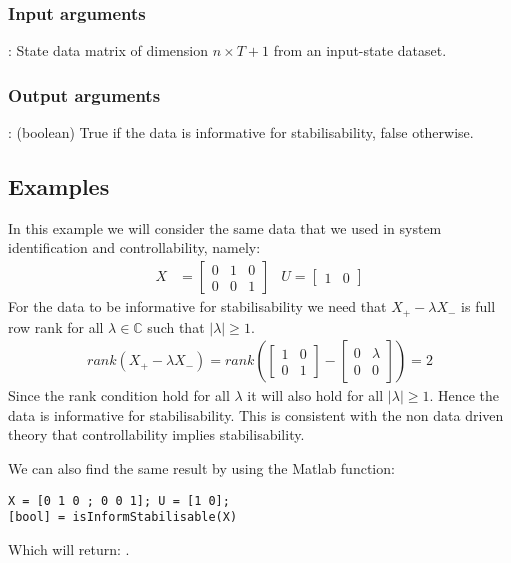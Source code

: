 \subsubsection*{Input arguments}
\textbf{}: State data matrix of dimension $n \times T+1$ from an input-state dataset. \

\subsubsection*{Output arguments}
\textbf{}: (boolean) True if the data is informative for stabilisability, false otherwise.

\subsection{Examples}
In this example we will consider the same data that we used in system identification and controllability, namely:
\begin{align*}
X &= \begin{bmatrix} 0&1&0 \\ 0&0&1 \end{bmatrix} & U = \begin{bmatrix}	1&0	\end{bmatrix}
\end{align*} 
For the data to be informative for stabilisability we need that $X_+ - \lambda X_-$ is full row rank for all $\lambda \in \mathbb{C}$ such that $|\lambda| \geq 1$.
\begin{align*}
rank(X_+ - \lambda X_-) = rank\left(\begin{bmatrix} 1&0\\0&1\end{bmatrix} - \begin{bmatrix} 0&\lambda\\0&0\end{bmatrix}\right) = 2
\end{align*}
Since the rank condition hold for all $\lambda$ it will also hold for all $|\lambda| \geq 1$. Hence the data is informative for stabilisability. This is consistent with the non data driven theory that controllability implies stabilisability. 

We can also find the same result by using the Matlab function:
\begin{lstlisting}
X = [0 1 0 ; 0 0 1]; U = [1 0];
[bool] = isInformStabilisable(X)
\end{lstlisting}
Which will return: \mon{[ 1 ]}.


